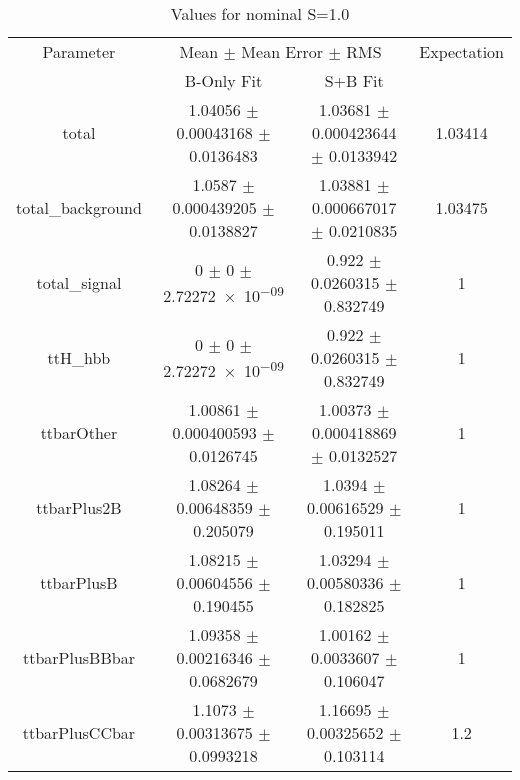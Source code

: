 \begin{table}
\centering
\caption{Values for nominal S=1.0}
\begin{tabular}{cccc}
\toprule
Parameter & \multicolumn{2}{c}{Mean $\pm$ Mean Error $\pm$ RMS} & Expectation\\
 & B-Only Fit & S+B Fit & \\
\midrule
total & \num{1.04056} $\pm$ \num{0.00043168} $\pm$ \num{0.0136483} & \num{1.03681} $\pm$ \num{0.000423644} $\pm$ \num{0.0133942} & \num{1.03414}\\
total\_background & \num{1.0587} $\pm$ \num{0.000439205} $\pm$ \num{0.0138827} & \num{1.03881} $\pm$ \num{0.000667017} $\pm$ \num{0.0210835} & \num{1.03475}\\
total\_signal & \num{0} $\pm$ \num{0} $\pm$ \num{2.72272e-09} & \num{0.922} $\pm$ \num{0.0260315} $\pm$ \num{0.832749} & \num{1}\\
ttH\_hbb & \num{0} $\pm$ \num{0} $\pm$ \num{2.72272e-09} & \num{0.922} $\pm$ \num{0.0260315} $\pm$ \num{0.832749} & \num{1}\\
ttbarOther & \num{1.00861} $\pm$ \num{0.000400593} $\pm$ \num{0.0126745} & \num{1.00373} $\pm$ \num{0.000418869} $\pm$ \num{0.0132527} & \num{1}\\
ttbarPlus2B & \num{1.08264} $\pm$ \num{0.00648359} $\pm$ \num{0.205079} & \num{1.0394} $\pm$ \num{0.00616529} $\pm$ \num{0.195011} & \num{1}\\
ttbarPlusB & \num{1.08215} $\pm$ \num{0.00604556} $\pm$ \num{0.190455} & \num{1.03294} $\pm$ \num{0.00580336} $\pm$ \num{0.182825} & \num{1}\\
ttbarPlusBBbar & \num{1.09358} $\pm$ \num{0.00216346} $\pm$ \num{0.0682679} & \num{1.00162} $\pm$ \num{0.0033607} $\pm$ \num{0.106047} & \num{1}\\
ttbarPlusCCbar & \num{1.1073} $\pm$ \num{0.00313675} $\pm$ \num{0.0993218} & \num{1.16695} $\pm$ \num{0.00325652} $\pm$ \num{0.103114} & \num{1.2}\\
\bottomrule
\end{tabular}
\end{table}